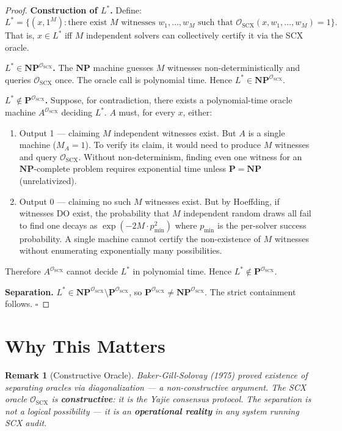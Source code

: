 \documentclass[11pt,a4paper]{article}
\newtheorem{remark}[theorem]{Remark}
\newcommand{\NP}{\mathbf{NP}}
\newcommand{\PP}{\mathbf{P}}
\begin{document}
\begin{proof}
\textbf{Construction of $L^*$.} Define:
\[
L^* = \{(x, 1^M) : \text{there exist } M \text{ witnesses } w_1,\ldots,w_M \text{ such that } \mathcal{O}_{\text{SCX}}(x, w_1,\ldots,w_M) = 1\}.
\]
That is, $x \in L^*$ iff $M$ independent solvers can collectively certify it via the SCX oracle.

\textbf{$L^* \in \NP^{\mathcal{O}_{\text{SCX}}}$.} The $\NP$ machine guesses $M$ witnesses non-deterministically and queries $\mathcal{O}_{\text{SCX}}$ once. The oracle call is polynomial time. Hence $L^* \in \NP^{\mathcal{O}_{\text{SCX}}}$.

\textbf{$L^* \notin \PP^{\mathcal{O}_{\text{SCX}}}$.} Suppose, for contradiction, there exists a polynomial-time oracle machine $A^{\mathcal{O}_{\text{SCX}}}$ deciding $L^*$. $A$ must, for every $x$, either:

\begin{enumerate}[nosep]
    \item Output 1 — claiming $M$ independent witnesses exist. But $A$ is a single machine ($M_A=1$). To verify its claim, it would need to produce $M$ witnesses and query $\mathcal{O}_{\text{SCX}}$. Without non-determinism, finding even one witness for an $\NP$-complete problem requires exponential time unless $\PP = \NP$ (unrelativized).
    \item Output 0 — claiming no such $M$ witnesses exist. But by Hoeffding, if witnesses DO exist, the probability that $M$ independent random draws all fail to find one decays as $\exp(-2M \cdot p_{\min}^2)$ where $p_{\min}$ is the per-solver success probability. A single machine cannot certify the non-existence of $M$ witnesses without enumerating exponentially many possibilities.
\end{enumerate}

Therefore $A^{\mathcal{O}_{\text{SCX}}}$ cannot decide $L^*$ in polynomial time. Hence $L^* \notin \PP^{\mathcal{O}_{\text{SCX}}}$.

\textbf{Separation.} $L^* \in \NP^{\mathcal{O}_{\text{SCX}}} \setminus \PP^{\mathcal{O}_{\text{SCX}}}$, so $\PP^{\mathcal{O}_{\text{SCX}}} \neq \NP^{\mathcal{O}_{\text{SCX}}}$. The strict containment follows. $\square$
\end{proof}

\section{Why This Matters}

\begin{remark}[Constructive Oracle]
Baker-Gill-Solovay (1975) proved existence of separating oracles via diagonalization — a non-constructive argument. The SCX oracle $\mathcal{O}_{\text{SCX}}$ is \textbf{constructive}: it is the Yajie consensus protocol. The separation is not a logical possibility — it is an \textbf{operational reality} in any system running SCX audit.
\end{remark}
\end{document}
